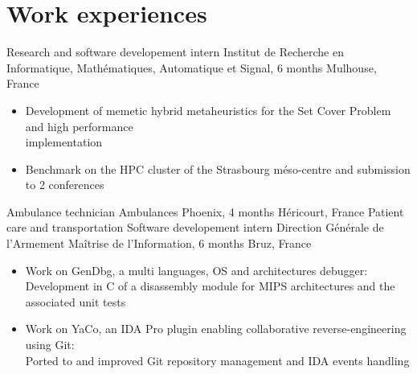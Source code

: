 \documentclass[a4paper,10pt,sans]{moderncv}
\begin{document}

	\vspace*{\deletedSpace}
	\section{Work experiences}
			{Research and software developement intern}
			{Institut de Recherche en Informatique, Mathématiques, Automatique et Signal, 6 months\hspace{-25pt}}
			{Mulhouse, France}
			{}
			{}
			\vspace{-5pt}
			\begin{itemize}
				\item Development of memetic hybrid metaheuristics for the Set Cover Problem and \Cpp{} high performance\\
					implementation
				\item Benchmark on the HPC cluster of the Strasbourg méso-centre and submission to 2 conferences
			\end{itemize}
			\vspace{5pt}
			{Ambulance technician}
			{Ambulances Phoenix, 4 months}
			{Héricourt, France}
			{Patient care and transportation}
			{}
			{Software developement intern}
			{Direction Générale de l'Armement Maîtrise de l'Information, 6 months}
			{Bruz, France}
			{}
			{}
			\vspace{-5pt}
			\begin{itemize}
				\item Work on GenDbg, a multi languages, OS and architectures debugger:\\
					\phantom{=}Development in C of a disassembly module for MIPS architectures and the associated unit tests
				\item Work on YaCo, an IDA Pro plugin enabling collaborative reverse-engineering using Git:\\
					\phantom{=}Ported to \Cpp{} and improved Git repository management and IDA events handling
			\end{itemize}
\end{document}

